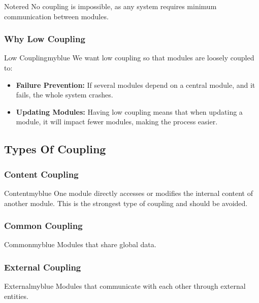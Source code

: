 \begin{prettyBox}{Note}{red}
No coupling is impossible, as any system requires minimum communication 
between modules.
\end{prettyBox}

\vspace{0.35cm}
\subsubsection{Why Low Coupling}
\begin{prettyBox}{Low Coupling}{myblue}
We want low coupling so that modules are loosely coupled to:
\begin{itemize}
    \item \textbf{Failure Prevention:} If several modules depend on a central module, and it fails, the whole system crashes.
    \item \textbf{Updating Modules:} Having low coupling means that when updating a module, it will impact fewer modules, making the process easier.
\end{itemize}
\end{prettyBox}

\vspace{0.5cm}
\subsection{Types Of Coupling}
\subsubsection{Content Coupling}  
\begin{prettyBox}{Content}{myblue}  
One module directly accesses or modifies the internal content of another module. 
This is the strongest type of coupling and should be avoided.
\end{prettyBox}  

\vspace{0.25cm}

\subsubsection{Common Coupling}
\begin{prettyBox}{Common}{myblue}
Modules that share global data.
\end{prettyBox}

\vspace{0.25cm}

\subsubsection{External Coupling}  
\begin{prettyBox}{External}{myblue}  
Modules that communicate with each other through external entities.  
\end{prettyBox}  

